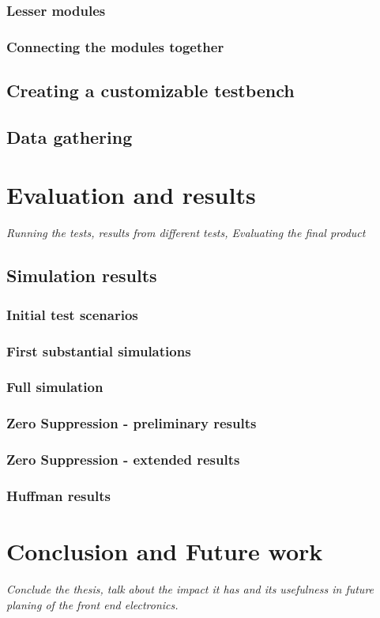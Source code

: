 \documentclass[a4paper, 12pt]{report}
\begin{document}
\begin{minipage}{\linewidth}

\end{minipage}

\subsection{Lesser modules}
\subsection{Connecting the modules together}
\section{Creating a customizable testbench}
\section{Data gathering}

\chapter{Evaluation and results}
\textit{Running the tests, results from different tests, Evaluating the final product}
\section{Simulation results}
\subsection{Initial test scenarios}
\subsection{First substantial simulations}
\subsection{Full simulation}

\subsection{Zero Suppression - preliminary results}
\subsection{Zero Suppression - extended results}
\subsection{Huffman results}

\chapter{Conclusion and Future work}
\textit{Conclude the thesis, talk about the impact it has and its usefulness in future planing of the front end electronics.}

{}

\end{document}
